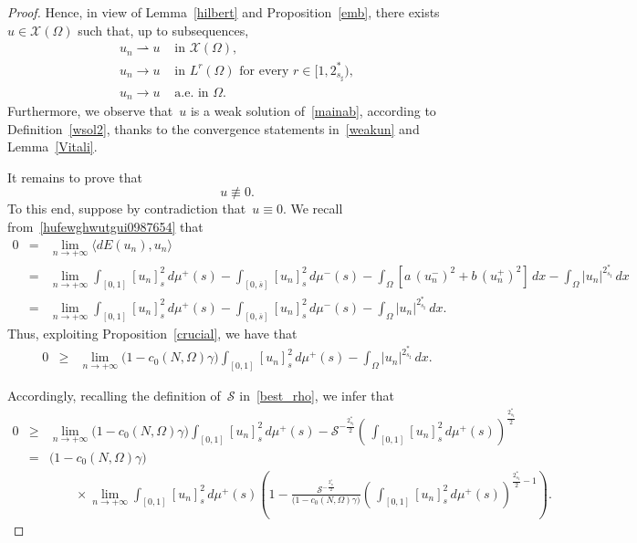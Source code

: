 \documentclass[10pt,a4paper]{amsart}
\renewcommand{\ge}{\geqslant}
\begin{document}
\begin{proof}
Hence, in view of Lemma~\ref{hilbert} and
Proposition~\ref{emb}, there exists~$u\in \mathcal{X}(\Omega)$ such that, up to subsequences,
\begin{equation}\label{weakun}\begin{split}
u_n\rightharpoonup u &\text{ in } \mathcal{X}(\Omega),\\ 
u_n\to u &\text{ in } L^{r}(\Omega) \text{ for every } r\in [1, 2_{s_\sharp}^*),\\ 
u_n\to u &\text{ a.e. in } \Omega.
\end{split}\end{equation}
Furthermore, we observe that~$u$ is a weak solution of~\eqref{mainab},
according to Definition~\ref{wsol2}, thanks to the convergence statements
in~\eqref{weakun} and Lemma~\ref{Vitali}.

It remains to prove that
\begin{equation}\label{uzerosper00}
u\not\equiv 0.\end{equation}
To this end,
suppose by contradiction that~$u\equiv 0$. 
We recall from~\eqref{hufewghwutgui0987654} that
\begin{eqnarray*} 0&=&
\lim_{n\to+\infty}\langle dE(u_n), u_n\rangle \\
&=&\lim_{n\to+\infty} \int_{[{{ 0 }}, 1]} [u_n]^2_{s}\, d\mu^+ (s) -\int_{[{{ 0 }}, \overline s]} [u_n]^2_s \, d\mu^-(s) - \int_\Omega \left[a\, (u_n^-)^2 + b\, (u_n^+)^2\right] \,dx - \int_\Omega |u_n|^{2_{s_\sharp}^\ast}\, dx \\&=&
\lim_{n\to+\infty} \int_{[{{ 0 }}, 1]} [u_n]^2_{s}\, d\mu^+ (s) -\int_{[{{ 0 }}, \overline s]} [u_n]^2_s \, d\mu^-(s) - \int_\Omega |u_n|^{2_{s_\sharp}^\ast}\, dx.
\end{eqnarray*}
Thus, exploiting Proposition~\ref{crucial}, we have that
\begin{eqnarray*} 0&\ge&
\lim_{n\to+\infty} \big(1-c_0(N,\Omega)\gamma\big)\int_{[{{ 0 }}, 1]} [u_n]^2_{s}\, d\mu^+ (s)  - \int_\Omega |u_n|^{2_{s_\sharp}^\ast}\, dx.
\end{eqnarray*}

Accordingly, recalling the definition of~${\mathcal{S}}$ in~\eqref{best_rho}, we infer that
\begin{eqnarray*}
0 &\ge& \lim_{n\to+\infty} 
\big(1-c_0(N,\Omega)\gamma\big)\int_{[{{ 0 }}, 1]} [u_n]^2_{s}\, d\mu^+ (s)
-\mathcal{S}^{-\frac{2_{s_\sharp}^*}2}
\left(\, \int_{[{{ 0 }}, 1]} [u_n]^2_{s}\, d\mu^+ (s)\right)^{\frac{2_{s_\sharp}^*}2}\\
&=&  \big(1-c_0(N,\Omega)\gamma\big)\\&&\qquad\times\lim_{n\to+\infty} 
\int_{[{{ 0 }}, 1]} [u_n]^2_{s}\, d\mu^+ (s) \left(1 - \frac{\mathcal{S}^{-\frac{2_{s_\sharp}^*}2}}{\big(1-c_0(N,\Omega)\gamma\big)}
\left(\, \int_{[{{ 0 }}, 1]} [u_n]^2_{s}\, d\mu^+ (s)\right)^{\frac{2_{s_\sharp}^*}2-1 }\right).
\end{eqnarray*}


\end{proof}
\end{document}
